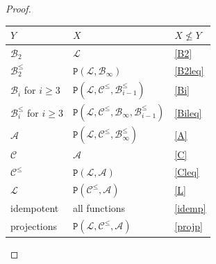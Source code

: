 \documentclass{amsart}
\numberwithin{equation}{section}
\theoremstyle{plain}
\theoremstyle{definition}
\def\clone#1{\mathcal{#1}}
\def\Bc{\clone{B}}
\def\Ac{\clone{A}}
\def\Lc{\clone{L}}
\def\Cc{\clone{C}}
\def\C#1{{\mathtt{P}}(#1)}
\begin{document}
\begin{proof}
\begin{center}
\begin{tabular}{ |l|l|l| } 
 \hline
 $Y$                       & $X$                                       & $X\not\leq Y$ \\
 \hline
 $\Bc_2$                   & $\Lc$                                     & \ref{B2} \\
 $\Bc_2^\leq$               & $\C{\Lc,\Bc_\infty}$                       & \ref{B2leq} \\
 $\Bc_i$ for $i\geq 3$     & $\C{\Lc,\Cc^\leq,\Bc_{i-1}^\leq}$           & \ref{Bi} \\
 $\Bc_i^\leq$ for $i\geq 3$ & $\C{\Lc,\Cc^\leq,\Bc_\infty,\Bc_{i-1}^\leq}$ & \ref{Bileq} \\
 $\Ac$                     & $\C{\Lc,\Cc^\leq,\Bc_\infty^\leq}$          & \ref{A} \\
 $\Cc$                     & $\Ac$                                     & \ref{C} \\
 $\Cc^\leq$                 & $\C{\Lc,\Ac}$                             & \ref{Cleq} \\
 $\Lc$                     & $\C{\Cc^\leq,\Ac}$                         & \ref{L} \\
 idempotent                & all functions                             & \ref{idemp} \\
 projections               & $\C{\Lc,\Cc^\leq,\Ac}$                     & \ref{projp} \\
 \hline
\end{tabular}
\end{center}
\end{proof}
\end{document}
